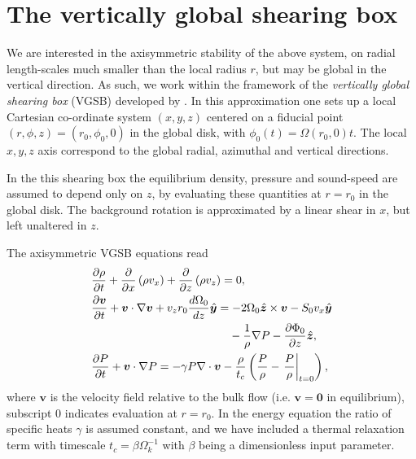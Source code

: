 \section{The vertically global shearing box} 
We are interested in the axisymmetric stability of the above system,
on radial length-scales much smaller than the local radius $r$, but
may be global in the vertical direction. As such, we work within the
framework of the \emph{vertically global shearing 
  box} (VGSB) developed by \cite{mcnally14}. In this approximation
one sets up a local Cartesian co-ordinate  system $(x,y,z)$ centered
on a fiducial point $(r,\phi,z)=(r_0,\phi_0,0)$ in the global disk, with $\phi_0(t) =
\Omega(r_0,0)t$. The local $x,y,z$ axis correspond to the
global radial, azimuthal and vertical directions.  

In the this shearing box the equilibrium density, pressure and
sound-speed are assumed to depend only on $z$, by evaluating these
quantities at $r=r_0$ in the global disk. The background rotation is
approximated by a linear shear in $x$, but left unaltered in $z$.     

The axisymmetric VGSB equations read 
\begin{align}
  & \frac{\p\rho}{\p t} + \frac{\p}{\p x}\left(\rho v_x\right) +
  \frac{\p}{\p z}\left(\rho v_z\right)=0,\\
  & \frac{\p\bm{v}}{\p t} + \bm{v}\cdot\nabla\bm{v} +
  v_zr_0\frac{d\Omega_0}{dz} \hat{\bm{y}} = - 
  2\Omega_0\hat{\bm{z}}\times\bm{v} - S_0v_x\hat{\bm{y}} \notag\\ 
  &\phantom{\frac{\p\bm{v}}{\p t} + \bm{v}\cdot\nabla\bm{v} +
    v_zr_0\frac{d\Omega_0}{dz} \hat{\bm{y}}=}-\frac{1}{\rho}\nabla P - \frac{\p\Phi_0}{\p z}\hat{\bm{z}},\\
  & \frac{\p P}{\p t} + \bm{v}\cdot\nabla P = -\gamma P
  \nabla\cdot\bm{v} -
  \frac{\rho}{t_c}\left(\frac{P}{\rho}-\left.\frac{P}{\rho}\right|_{t=0}\right), \label{energy_eq}
\end{align}
where $\bm{v}$ is the velocity field relative to the bulk flow
(i.e. $\bm{v}=\bm{0}$ in equilibrium),  
subscript $0$ indicates evaluation at $r=r_0$. In the energy equation
the ratio of specific heats $\gamma$ is assumed constant, 
and we have included a thermal relaxation term with timescale
$t_c=\beta\Omega_k^{-1}$ with $\beta$  being a dimensionless input
parameter.    

